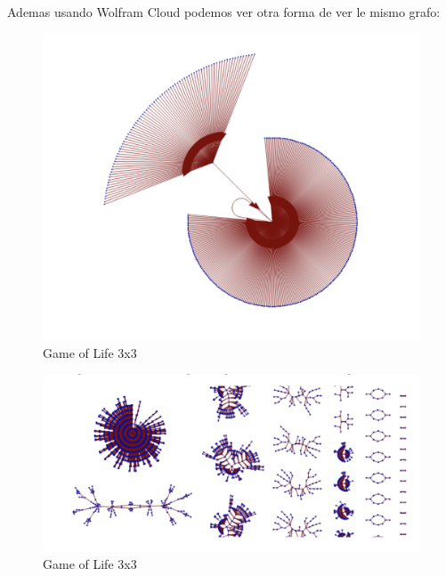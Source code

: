 \documentclass[12pt, fleqn]{report}                             %
\theoremstyle{break}                                            %
\begin{document}
        Ademas usando Wolfram Cloud podemos ver otra forma de ver le mismo grafo:

        \begin{figure}[ht!]
          \centering
          \includegraphics[height=0.8\textwidth]{life3x3.png}
          \caption{Game of Life 3x3}
        \end{figure}

        \begin{figure}[ht!]
          \centering
          \includegraphics[height=0.4\textwidth]{life3x31.png}
          \caption{Game of Life 3x3}
        \end{figure}
\end{document}
